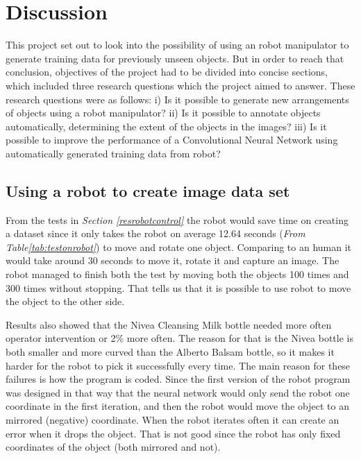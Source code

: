 \chapter{Discussion}
This project set out to look into the possibility of using an robot manipulator to generate training data for previously unseen objects. But in order to reach that conclusion, objectives of the project had to be divided into concise sections, which included three research questions which the project aimed to answer. These research questions were as follows: i) Is it possible to generate new arrangements of objects using a robot manipulator? ii) Is it possible to annotate objects automatically, determining the extent of the objects in the images? iii) Is it possible to improve the performance of a Convolutional Neural Network using automatically generated training data from robot?

\section{Using a robot to create image data set}
From the tests in \textit{Section \ref{resrobotcontrol}} the robot would save time on creating a dataset since it only takes the robot on average 12.64 seconds (\textit{From Table\ref{tab:testonrobot}}) to move and rotate one object. Comparing to an human it would take around 30 seconds to move it, rotate it and capture an image. The robot managed to finish both the test by moving both the objects 100 times and 300 times without stopping. That tells us that it is possible to use robot to move the object to the other side. 

Results also showed that the Nivea Cleansing Milk bottle needed more often operator intervention or 2\% more often. The reason for that is the Nivea bottle is both smaller and more curved than the Alberto Balsam bottle, so it makes it harder for the robot to pick it successfully every time. The main reason for these failures is how the program is coded. Since the first version of the robot program was designed in that way that the neural network would only send the robot one coordinate in the first iteration, and then the robot would move the object to an mirrored (negative) coordinate. When the robot iterates often it can create an error when it drops the object. That is not good since the robot has only fixed coordinates of the object (both mirrored and not).

